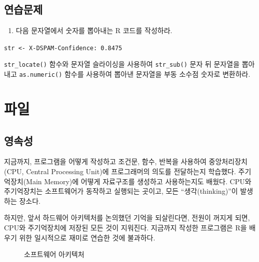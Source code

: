 \documentclass[
  letterpaper,
]{book}
\providecommand{\tightlist}{%
  \setlength{\itemsep}{0pt}\setlength{\parskip}{0pt}}\usepackage{longtable,booktabs,array}
\begin{document}
\section*{연습문제}\label{r-string-ex}


\begin{enumerate}
\def\labelenumi{\arabic{enumi}.}
\tightlist
\item
  다음 문자열에서 숫자를 뽑아내는 R 코드를 작성하라.
\end{enumerate}

\texttt{str\ \textless{}-\ \textquotesingle{}X-DSPAM-Confidence:\ 0.8475\textquotesingle{}}

\texttt{str\_locate()} 함수와 문자열 슬라이싱을 사용하여
\texttt{str\_sub()} 문자 뒤 문자열을 뽑아내고 \texttt{as.numeric()}
함수를 사용하여 뽑아낸 문자열을 부동 소수점 숫자로 변환하라.

\chapter{파일}\label{r-file}

 

\section{영속성}\label{r-file-persistence}

 

지금까지, 프로그램을 어떻게 작성하고 조건문, 함수, 반복을 사용하여
중앙처리장치(CPU, Central Processing Unit)에 프로그래머의 의도를
전달하는지 학습했다. 주기억장치(Main Memory)에 어떻게 자료구조를
생성하고 사용하는지도 배웠다. CPU와 주기억장치는 소프트웨어가 동작하고
실행되는 곳이고, 모든 ``생각(thinking)''이 발생하는 장소다.

하지만, 앞서 하드웨어 아키텍처를 논의했던 기억을 되살린다면, 전원이
꺼지게 되면, CPU와 주기억장치에 저장된 모든 것이 지워진다. 지금까지
작성한 프로그램은 R을 배우기 위한 일시적으로 재미로 연습한 것에
불과하다.

\begin{figure}


\caption{\label{fig-software-architecture}소프트웨어 아키텍처}

\end{figure}%
\end{document}
